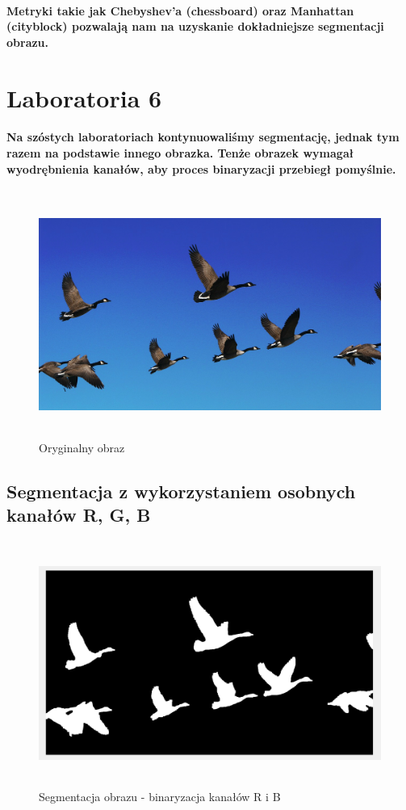 \documentclass[a4paper,12pt]{article}
\begin{document}
\begin{justify}
\paragraph{Metryki takie jak Chebyshev'a (chessboard) oraz Manhattan (cityblock) pozwalają nam na uzyskanie dokładniejsze segmentacji obrazu.}

\section{Laboratoria 6}

\paragraph{Na szóstych laboratoriach kontynuowaliśmy segmentację, jednak tym razem na podstawie innego obrazka. Tenże obrazek wymagał wyodrębnienia kanałów, aby proces binaryzacji przebiegł pomyślnie.}

\begin{figure}[h]
\centering
\includegraphics[width=12cm, height=8cm]{ptaki}
\caption{Oryginalny obraz}
\end{figure}

\newpage

\subsection{Segmentacja z wykorzystaniem osobnych kanałów R, G, B}

\begin{figure}[h]
\centering
\includegraphics[width=12cm, height=8cm]{14}
\caption{Segmentacja obrazu - binaryzacja kanałów R i B}
\end{figure}


\end{justify}
\end{document}
